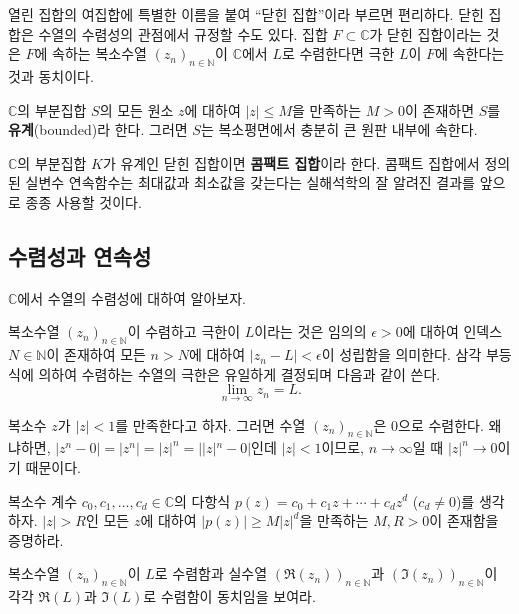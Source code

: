 열린 집합의 여집합에 특별한 이름을 붙여 ``닫힌 집합''이라 부르면 편리하다.
닫힌 집합은 수열의 수렴성의 관점에서 규정할 수도 있다.
집합 $F\subset \mathbb C$가 닫힌 집합이라는 것은
$F$에 속하는 복소수열 $(z_n)_{n\in\mathbb N}$이  $\mathbb C$에서 $L$로 수렴한다면
극한 $L$이 $F$에 속한다는 것과 동치이다.

$\mathbb C$의 부분집합 $S$의 모든 원소 $z$에 대하여
$|z|\le M$을 만족하는 $M>0$이 존재하면 $S$를 {\bf 유계}(bounded)라 한다.
그러면 $S$는 복소평면에서 충분히 큰 원판 내부에 속한다.

$\mathbb C$의 부분집합 $K$가 유계인 닫힌 집합이면 {\bf 콤팩트 집합}이라 한다.
콤팩트 집합에서 정의된 실변수 연속함수는 최대값과 최소값을 갖는다는
실해석학의 잘 알려진 결과를
앞으로 종종 사용할 것이다.

\subsection{수렴성과 연속성}

$\mathbb C$에서 수열의 수렴성에 대하여 알아보자.
 
복소수열 $(z_n)_{n\in\mathbb N}$이 수렴하고 극한이 $L$이라는 것은
임의의 $\epsilon>0$에 대하여 인덱스 $N\in\mathbb N$이 존재하여
모든 $n>N$에 대하여 $|z_n -L| < \epsilon$이 성립함을 의미한다.
삼각 부등식에 의하여 수렴하는 수열의 극한은 유일하게 결정되며
다음과 같이 쓴다.
$$
\lim_{n\to\infty} z_n = L.
$$

\begin{salt_example} \label{example-1-1}
복소수 $z$가 $|z|<1$를 만족한다고 하자.
그러면 수열 $(z_n)_{n\in\mathbb N}$은 $0$으로 수렴한다.
왜냐하면, $|z^n-0| = |z^n| = |z|^n = ||z|^n-0|$인데
$|z|<1$이므로, $n\to\infty$일 때 $|z|^n\to0$이기 때문이다.
\end{salt_example}

\begin{salt_exercise} \label{ex-1-24}
복소수 계수 $c_0, c_1, \ldots, c_d\in \mathbb C$의
다항식 $p(z)=c_0 + c_1z + \cdots + c_dz^d$ ($c_d\ne0$)를 생각하자.
$|z|>R$인 모든 $z$에 대하여 $|p(z)| \ge M|z|^d$을 만족하는
$M, R>0$이 존재함을 증명하라.
\end{salt_exercise}

\begin{salt_exercise} \label{ex-1-25}
복소수열 $(z_n)_{n\in\mathbb N}$이 $L$로 수렴함과
실수열 $(\Re(z_n))_{n\in\mathbb N}$과  $(\Im(z_n))_{n\in\mathbb N}$이
각각 $\Re(L)$과 $\Im(L)$로 수렴함이 동치임을 보여라.
\end{salt_exercise}


